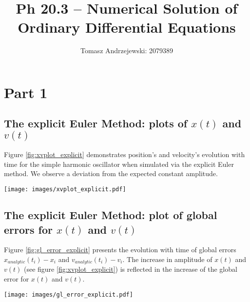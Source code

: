 \documentclass{article}
\newenvironment{Figure}
  {\par\medskip\noindent\minipage{\linewidth}}
  {\endminipage\par\medskip}
\begin{document}
\title{Ph 20.3 – Numerical Solution of Ordinary Differential Equations}
\author{Tomasz Andrzejewski: 2079389}

\maketitle

\section{Part 1}
\subsection{The explicit Euler Method: plots of $x(t)$ and $v(t)$}

Figure \ref{fig:xvplot_explicit} demonstrates position's and velocity's evolution with time for the simple harmonic oscillator when simulated via the explicit Euler method. We observe a deviation from the expected constant amplitude.


\begin{Figure}
\centering
\texttt{[image: images/xvplot\_explicit.pdf]}
\label{fig:xvplot_explicit}
\end{Figure}

\newpage

\subsection{The explicit Euler Method: plot of global errors for $x(t)$ and $v(t)$}

Figure \ref{fig:gl_error_explicit} presents the evolution with time of global errors $ x_{analytic}(t_{i}) - x_{i} $ and $ v_{analytic}(t_{i}) - v_{i} $. The increase in amplitude of $x(t)$ and $v(t)$ (see figure \ref{fig:xvplot_explicit}) is reflected in the increase of the global error for $x(t)$ and $v(t)$.

\begin{Figure}
\centering
\texttt{[image: images/gl\_error\_explicit.pdf]}
\label{fig:gl_error_explicit}
\end{Figure}
\end{document}
